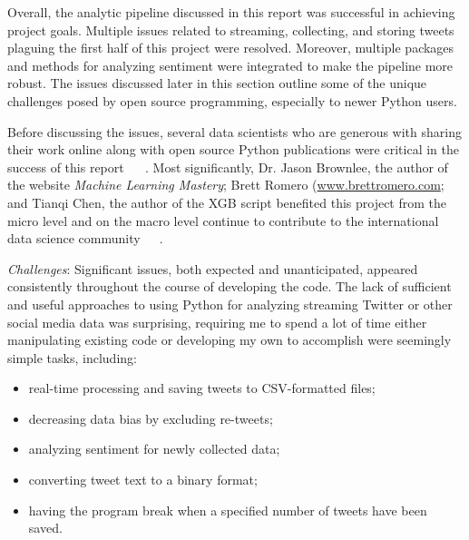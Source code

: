 Overall, the analytic pipeline discussed in this report was successful
in achieving project goals.  Multiple issues related to streaming,
collecting, and storing tweets plaguing the first half of this project
were resolved.  Moreover, multiple packages and methods for analyzing
sentiment were integrated to make the pipeline more robust.  The
issues discussed later in this section outline some of the unique
challenges posed by open source programming, especially to newer
Python users.

Before discussing the issues, several data scientists who are generous
with sharing their work online along with open source Python
publications were critical in the success of this report
~\cite{sweigart2015} ~\cite{ojeda2014}.  Most significantly, Dr. Jason
Brownlee, the author of the website \emph{Machine Learning Mastery};
Brett Romero (\url{www.brettromero.com}; and Tianqi Chen, the author
of the XGB script benefited this project from the micro level and on
the macro level continue to contribute to the international data
science
community~\cite{brownlee_2016}~\cite{romero2016}~\cite{Chen2016}.

\emph{Challenges}: Significant issues, both expected and
unanticipated, appeared consistently throughout the course of
developing the code.  The lack of sufficient and useful approaches to
using Python for analyzing streaming Twitter or other social media
data was surprising, requiring me to spend a lot of time either
manipulating existing code or developing my own to accomplish were
seemingly simple tasks, including:

\begin{itemize}	
\item real-time processing and saving tweets to CSV-formatted files;
\item decreasing data bias by excluding re-tweets;
\item analyzing sentiment for newly collected
data;
\item converting tweet text to a binary format;
\item having the program break when a specified
number of tweets have been saved.
\end{itemize}

